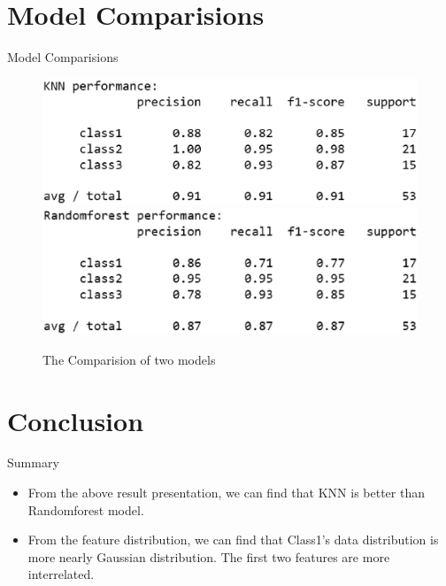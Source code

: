\documentclass[
 size=12pt,
 paper=smartboard, %
 mode=present, %
 display=slides, %
 style=tuliplab,  %
 pauseslide,
 fleqn,leqno,clock]{powerdot}
\begin{document}
\section{Model Comparisions}

\begin{slide}{Model Comparisions}
\begin{figure}
  \centering
  \includegraphics[width=6in]{Figures/3.eps}\\
  \includegraphics[width=6in]{Figures/4.eps}\\
  \caption{The Comparision of two models}
  \label{The Comparisions of two models}
\end{figure}

\end{slide}

\section{Conclusion}
\begin{slide}{Summary}
\begin{itemize}
\item From the above result presentation, we can find that
    \subitem KNN is better than Randomforest model.

\bigskip
\item From the feature distribution, we can find that
    \subitem Class1's data distribution is  more nearly Gaussian distribution.
    \smallskip
    \subitem The first two features are more interrelated.
%
\end{itemize}
\end{slide}
\end{document}
